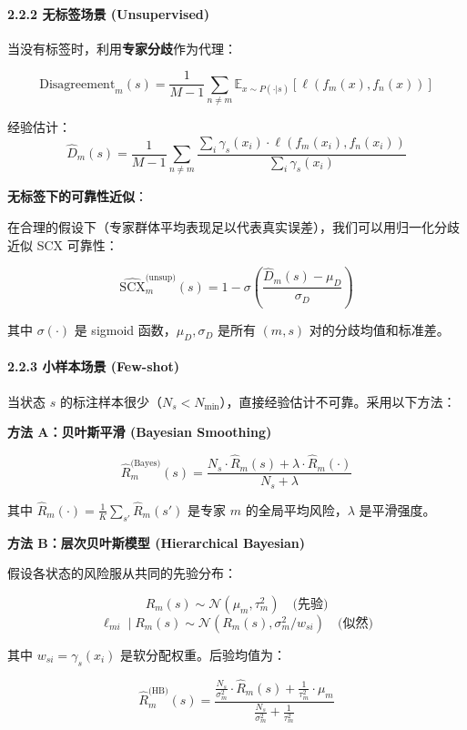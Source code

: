 \documentclass[
  12pt,
]{ctexart}
\begin{document}
\paragraph{2.2.2 无标签场景
(Unsupervised)}\label{ux65e0ux6807ux7b7eux573aux666f-unsupervised}

当没有标签时，利用\textbf{专家分歧}作为代理：

\[
\text{Disagreement}_m(s) = \frac{1}{M-1} \sum_{n \neq m} \mathbb{E}_{x \sim P(\cdot|s)} [\ell(f_m(x), f_n(x))]
\]

经验估计： \[
\hat{D}_m(s) = \frac{1}{M-1} \sum_{n \neq m} \frac{\sum_i \gamma_s(x_i) \cdot \ell(f_m(x_i), f_n(x_i))}{\sum_i \gamma_s(x_i)}
\]

\textbf{无标签下的可靠性近似}：

在合理的假设下（专家群体平均表现足以代表真实误差），我们可以用归一化分歧近似
SCX 可靠性：

\[
\widehat{\text{SCX}}_m^{\text{(unsup)}}(s) = 1 - \sigma\left( \frac{\hat{D}_m(s) - \mu_D}{\sigma_D} \right)
\]

其中 \(\sigma(\cdot)\) 是 sigmoid 函数，\(\mu_D, \sigma_D\) 是所有
\((m,s)\) 对的分歧均值和标准差。

\paragraph{2.2.3 小样本场景
(Few-shot)}\label{ux5c0fux6837ux672cux573aux666f-few-shot}

当状态 \(s\)
的标注样本很少（\(N_s < N_{\min}\)），直接经验估计不可靠。采用以下方法：

\textbf{方法 A：贝叶斯平滑 (Bayesian Smoothing)}

\[
\hat{R}_m^{\text{(Bayes)}}(s) = \frac{N_s \cdot \hat{R}_m(s) + \lambda \cdot \hat{R}_m(\cdot)}{N_s + \lambda}
\]

其中 \(\hat{R}_m(\cdot) = \frac{1}{K} \sum_{s'} \hat{R}_m(s')\) 是专家
\(m\) 的全局平均风险，\(\lambda\) 是平滑强度。

\textbf{方法 B：层次贝叶斯模型 (Hierarchical Bayesian)}

假设各状态的风险服从共同的先验分布：

\[
R_m(s) \sim \mathcal{N}(\mu_m, \tau_m^2) \quad \text{(先验)}
\] \[
\ell_{mi} \mid R_m(s) \sim \mathcal{N}(R_m(s), \sigma_m^2 / w_{si}) \quad \text{(似然)}
\]

其中 \(w_{si} = \gamma_s(x_i)\) 是软分配权重。后验均值为：

\[
\hat{R}_m^{\text{(HB)}}(s) = \frac{\frac{N_s}{\sigma_m^2} \cdot \hat{R}_m(s) + \frac{1}{\tau_m^2} \cdot \mu_m}{\frac{N_s}{\sigma_m^2} + \frac{1}{\tau_m^2}}
\]
\end{document}
